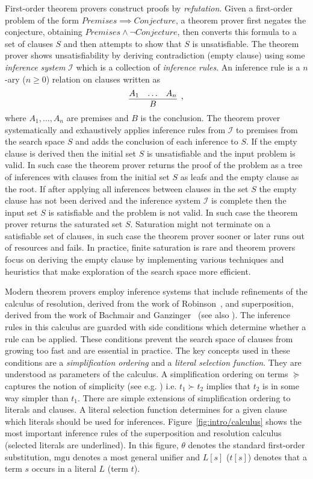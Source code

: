 First-order theorem provers construct proofs by \emph{refutation}. Given a first-order problem of the form $\mathit{Premises}\implies\mathit{Conjecture}$, a theorem prover first negates the conjecture, obtaining $\mathit{Premises}\wedge\neg\mathit{Conjecture}$, then converts this formula to a set of clauses $S$ and then attempts to show that $S$ is unsatisfiable. The theorem prover shows unsatisfiability by deriving contradiction (empty clause) using some \emph{inference system} $\mathcal{I}$ which is a collection of \emph{inference rules}. An inference rule is a $n$-ary ($n\ge0$) relation on clauses written as \[\infer[,]{B}{A_1 & \ldots & A_n}\] where $A_1,\ldots,A_n$ are premises and $B$ is the conclusion. The theorem prover systematically and exhaustively applies inference rules from $\mathcal{I}$ to premises from the search space $S$ and adds the conclusion of each inference to $S$. If the empty clause is derived then the initial set $S$ is unsatisfiable and the input problem is valid. In such case the theorem prover returns the proof of the problem as a tree of inferences with clauses from the initial set $S$ as leafs and the empty clause as the root. If after applying all inferences between clauses in the set $S$ the empty clause has not been derived and the inference system $\mathcal{I}$ is complete then the input set $S$ is satisfiable and the problem is not valid. In such case the theorem prover returns the saturated set $S$. Saturation might not terminate on a satisfiable set of clauses, in such case the theorem prover sooner or later runs out of resources and fails. In practice, finite saturation is rare and theorem provers focus on deriving the empty clause by implementing various techniques and heuristics that make exploration of the search space more efficient.

Modern theorem provers employ inference systems that include refinements of the calculus of resolution, derived from the work of Robinson~\cite{Robinson65}, and superposition, derived from the work of Bachmair and Ganzinger~\cite{BG94} (see also \cite{Ganzinger01,NieuwenhuisRubio:HandbookAR:paramodulation:2001}). The inference rules in this calculus are guarded with side conditions which determine whether a rule can be applied. These conditions prevent the search space of clauses from growing too fast and are essential in practice. The key concepts used in these conditions are a \emph{simplification ordering} and a \emph{literal selection function}. They are understood as parameters of the calculus. A simplification ordering on terms $\succeq$ captures the notion of simplicity (see e.g. \cite{DBLP:books/el/RV01/DershowitzP01}) i.e. $t_1 \succ t_2$ implies that $t_2$ is in some way simpler than $t_1$. There are simple extensions of simplification ordering to literals and clauses. A literal selection function determines for a given clause which literals should be used for inferences. Figure~\ref{fig:intro/calculus} shows the most important inference rules of the superposition and resolution calculus (selected literals are underlined). In this figure, $\theta$ denotes the standard first-order substitution, $\mathrm{mgu}$ denotes a most general unifier and $L[s]$ ($t[s]$) denotes that a term $s$ occurs in a literal $L$ (term $t$).

